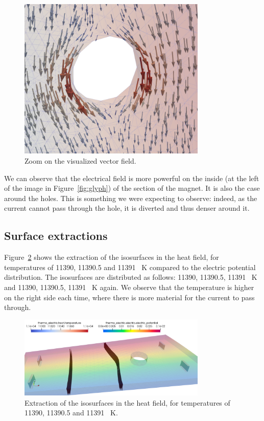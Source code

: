 \documentclass[12pt]{article}
\begin{document}
\begin{figure}[H]
  \centering
  \includegraphics[width=0.8\textwidth]{images/field1_zoom.png}
  \caption{Zoom on the visualized vector field.}
  \label{fig:field1_zoom}
\end{figure}

We can observe that the electrical field is more powerful on the inside (at the
left of the image in Figure~\ref{fig:glyph}) of the section of the magnet.
It is also the case around the holes. This is something we were expecting to
observe: indeed, as the current cannot pass through the hole, it is diverted and
thus denser around it.

\subsection{Surface extractions}
Figure~\ref{fig:isosurfaces} shows the extraction of the isosurfaces in the heat field,
for temperatures of 11390, 11390.5 and 11391 \SI{}{\kelvin} compared to the
electric potential distribution. The isosurfaces are distributed as follows: 11390, 11390.5, 11391 \SI{}{\kelvin} and
11390, 11390.5, 11391 \SI{}{\kelvin} again. We observe that the temperature is higher on the right
side each time, where there is more material for the current to pass through.

\begin{figure}[H]
  \centering
  \includegraphics[width=0.8\textwidth]{images/isosurfaces.png}
  \caption{Extraction of the isosurfaces in the heat field, for temperatures of
  11390, 11390.5 and 11391 \SI{}{\kelvin}.}
  \label{fig:isosurfaces}
\end{figure}
\end{document}
